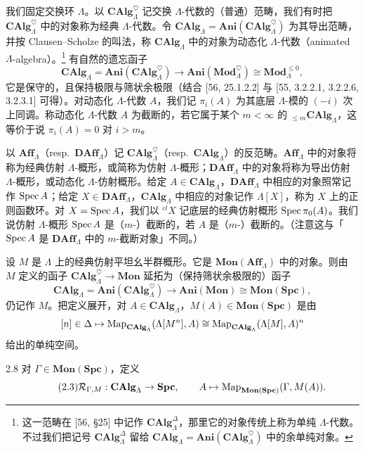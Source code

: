 我们固定交换环 $\Lambda$。以 $\mathbf{CAlg}_\Lambda^\heartsuit$ 记交换 $\Lambda$-代数的（普通）范畴，我们有时把 $\mathbf{CAlg}_\Lambda^\heartsuit$ 中的对象称为经典 $\Lambda$-代数。令 $\mathbf{CAlg}_\Lambda=\mathbf{Ani}(\mathbf{CAlg}_\Lambda^\heartsuit)$ 为其导出范畴，并按 Clausen–Scholze 的叫法，称 $\mathbf{CAlg}_\Lambda$ 中的对象为动态化 $\Lambda$-代数（animated $\Lambda$-algebra）。\footnote{这一范畴在 [56, §25] 中记作 $\mathbf{CAlg}_\Lambda^\Delta$，那里它的对象传统上称为单纯 $\Lambda$-代数。不过我们把记号 $\mathbf{CAlg}_\Lambda^\Delta$ 留给 $\mathbf{CAlg}_\Lambda=\mathbf{Ani}(\mathbf{CAlg}_\Lambda^\heartsuit)$ 中的余单纯对象。} 有自然的遗忘函子
\[
\mathbf{CAlg}_\Lambda=\mathbf{Ani}(\mathbf{CAlg}_\Lambda^\heartsuit)\to\mathbf{Ani}(\mathbf{Mod}_\Lambda^\heartsuit)\cong\mathbf{Mod}_\Lambda^{\le 0},
\]
它是保守的，且保持极限与筛状余极限（结合 [56, 25.1.2.2] 与 [55, 3.2.2.1, 3.2.2.6, 3.2.3.1] 可得）。对动态化 $\Lambda$-代数 $A$，我们记 $\pi_i(A)$ 为其底层 $\Lambda$-模的 $(-i)$ 次上同调。称动态化 $\Lambda$-代数 $A$ 为截断的，若它属于某个 $m<\infty$ 的 ${}_{\le m}\mathbf{CAlg}_\Lambda$，这等价于说 $\pi_i(A)=0$ 对 $i>m$。

以 $\mathbf{Aff}_\Lambda$（resp.\ $\mathbf{DAff}_\Lambda$）记 $\mathbf{CAlg}_\Lambda^\heartsuit$（resp.\ $\mathbf{CAlg}_\Lambda$）的反范畴。$\mathbf{Aff}_\Lambda$ 中的对象将称为经典仿射 $\Lambda$-概形，或简称为仿射 $\Lambda$-概形；$\mathbf{DAff}_\Lambda$ 中的对象将称为导出仿射 $\Lambda$-概形，或动态化 $\Lambda$-仿射概形。给定 $A\in\mathbf{CAlg}_\Lambda$，$\mathbf{DAff}_\Lambda$ 中相应的对象照常记作 $\operatorname{Spec} A$；给定 $X\in\mathbf{DAff}_\Lambda$，$\mathbf{CAlg}_\Lambda$ 中相应的对象记作 $\Lambda[X]$，称为 $X$ 上的正则函数环。对 $X=\operatorname{Spec} A$，我们以 ${}^{cl}X$ 记底层的经典仿射概形 $\operatorname{Spec}\pi_0(A)$。我们说仿射 $\Lambda$-概形 $\operatorname{Spec} A$ 是（$m$-）截断的，若 $A$ 是（$m$-）截断的。（注意这与「$\operatorname{Spec} A$ 是 $\mathbf{DAff}_\Lambda$ 中的 $m$-截断对象」不同。）

设 $M$ 是 $\Lambda$ 上的经典仿射平坦幺半群概形。它是 $\mathbf{Mon}(\mathbf{Aff}_\Lambda)$ 中的对象。则由 $M$ 定义的函子 $\mathbf{CAlg}_\Lambda^\heartsuit\to\mathbf{Mon}$ 延拓为（保持筛状余极限的）函子
\[
\mathbf{CAlg}_\Lambda=\mathbf{Ani}(\mathbf{CAlg}_\Lambda^\heartsuit)\to\mathbf{Ani}(\mathbf{Mon})\cong\mathbf{Mon}(\mathbf{Spc}),
\]
仍记作 $M$。把定义展开，对 $A\in\mathbf{CAlg}_\Lambda$，$M(A)\in\mathbf{Mon}(\mathbf{Spc})$ 是由
\[
[n]\in\Delta\mapsto\operatorname{Map}_{\mathbf{CAlg}_\Lambda}(\Lambda[M^n],A)\cong\operatorname{Map}_{\mathbf{CAlg}_\Lambda}(\Lambda[M],A)^n
\]
给出的单纯空间。

\begin{defn}{2.8}\label{defn:a2-2-8}
对 $\Gamma\in\mathbf{Mon}(\mathbf{Spc})$，定义
\begin{equation}\tag{2.3}
\mathcal R_{\Gamma,M}:\mathbf{CAlg}_\Lambda\to\mathbf{Spc},\qquad A\mapsto\operatorname{Map}_{\mathbf{Mon}(\mathbf{Spc})}(\Gamma,M(A)).
\end{equation}
\end{defn}

